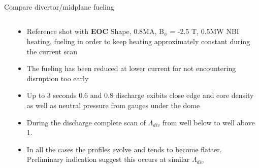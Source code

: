 \documentclass[10pt, compress]{beamer}
\newcommand\Fontvi{\fontsize{8}{7.2}\selectfont}
\begin{document}
\begin{frame}{Compare divertor/midplane fueling}
\Fontvi
  \vspace{-1cm}
\begin{columns}
  \begin{column}{0.65\textwidth}
  \end{column}
  \begin{column}{0.35\textwidth}
    \begin{itemize}
      \item Reference shot with \textbf{EOC} Shape, 0.8MA, B$_{\phi}$ = -2.5 T, 0.5MW NBI heating,
        fueling in order to keep heating approximately constant during
        the current scan
      \item<2-> The fueling has been reduced at lower current for not
        encountering disruption too early
      \item<3-> Up to 3 seconds 0.6 and 0.8 discharge exibits close
        edge and core density as well as neutral pressure from gauges
        under the dome
      \item<4-> During the discharge complete scan of $\Lambda_{div}$
        from well below to well above 1.
      \item<5> In all the cases the profiles evolve and tends to
        become flatter. Preliminary indication suggest this occurs at
        similar $\Lambda_{div}$
    \end{itemize}
  
  \end{column}
\end{columns}
\end{frame}
\end{document}
